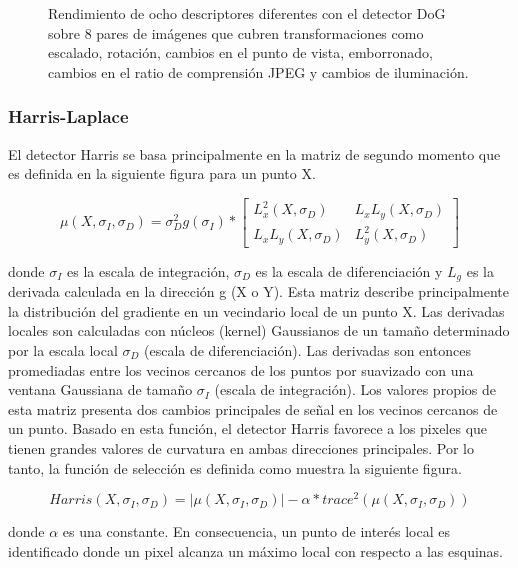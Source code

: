 \begin{figure}[htbp]
\centering
{}
\caption{Rendimiento de ocho descriptores diferentes con el detector DoG sobre 8 pares de imágenes que cubren transformaciones como escalado, rotación, cambios en el punto de vista, emborronado, cambios en el ratio de comprensión JPEG y cambios de iluminación.} \label{fig:señales}
\end{figure}


\subsubsection{Harris-Laplace}

El detector Harris \cite{Reference24} se basa principalmente en la matriz de segundo momento que es definida en la siguiente figura para un punto X.

\[
\mu (X, \sigma_{I}, \sigma_{D}) = \sigma_{D}^{2} g(\sigma_{I}) * \begin{bmatrix}
 L_{x}^{2}(X, \sigma_{D}) &  L_{x} L_{y}(X, \sigma_{D}) \\ 
  L_{x} L_{y}(X, \sigma_{D}) & L_{y}^{2}(X, \sigma_{D})
\end{bmatrix}
\]

donde $\sigma_{I}$ es la escala de integración, $\sigma_{D}$ es la escala de diferenciación y $ L_{g}$ es la derivada calculada en la dirección g (X o Y). Esta matriz describe principalmente la distribución del gradiente en un vecindario local de un punto X. Las derivadas locales son calculadas con núcleos (kernel) Gaussianos de un tamaño determinado por la escala local $\sigma_{D}$ (escala de diferenciación). Las derivadas son entonces promediadas entre los vecinos cercanos de los puntos por suavizado con una ventana Gaussiana de tamaño $\sigma_{I}$ (escala de integración). Los valores propios de esta matriz presenta dos cambios principales de señal en los vecinos cercanos de un punto. Basado en esta función, el detector Harris favorece a los pixeles que tienen grandes valores de curvatura en ambas direcciones principales. Por lo tanto, la función de selección es definida como muestra la siguiente figura. 

\[
Harris(X, \sigma_{I}, \sigma_{D}) = \left | \mu (X, \sigma_{I}, \sigma_{D}) \right | - \alpha*trace^{2}(\mu (X, \sigma_{I}, \sigma_{D}))
\]

donde $\alpha$ es una constante. En consecuencia, un punto de interés local es identificado donde un pixel alcanza un máximo local con respecto a las esquinas. \\

